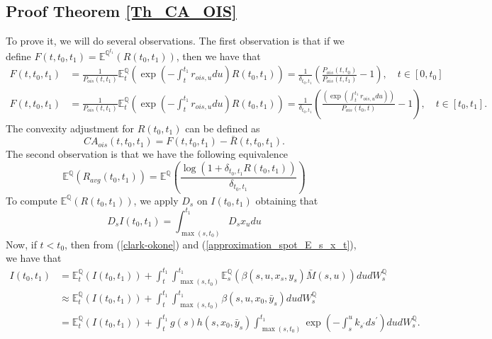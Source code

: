 \documentclass[a4paper,10pt]{article}
\newcommand{\1}{\mathbf{1}}
\begin{document}
\subsection{Proof Theorem \ref{Th_CA_OIS}}\label{Proof_CA_OIS_futures}
To prove it, we will do several observations. The first observation is that if we define $F(t,t_0,t_1) = \mathbb{E}^{\mathbb{Q}^{t_1}}\left( R(t_0,t_1)\right)$, then we have that
\begin{align*}
F(t,t_0,t_1)&= \frac{1}{P_{ois}(t,t_1)}  \mathbb{E}_{t}^{\mathbb{Q}}\left(\exp\left(-\int_{t}^{t_1} r_{ois,u} du \right) R(t_0,t_1) \right) = \frac{1}{\delta_{t_0,t_1}}\left(\frac{P_{ois}(t,t_0)}{P_{ois}(t,t_1)} - 1\right), \quad t \in [0,t_0] \\
F(t,t_0,t_1)&= \frac{1}{P_{ois}(t,t_1)} \mathbb{E}_{t}^{\mathbb{Q}}\left(\exp\left(-\int_{t}^{t_1} r_{ois,u} du \right) R(t_0,t_1) \right) = \frac{1}{\delta_{t_0,t_1}} \left(\frac{\left( \exp\left(\int_{t}^{t_1}r_{ois,u} du\right)\right)}{P_{ois}(t_0,t)}-1\right), \quad  t \in  [t_0, t_1].
\end{align*}
The convexity adjustment for $ R(t_0,t_1)$ can be defined as
\begin{equation}\label{R_ois_ca}
CA_{ois}(t,t_0,t_1) = F(t,t_0,t_1) - \bar{R}(t,t_0,t_1).
\end{equation}
The second observation is that we have the following equivalence
\begin{equation}\label{R_ois_avg}
\mathbb{E}^{\mathbb{Q}}\left(R_{avg}(t_0,t_1) \right) = \mathbb{E}^{\mathbb{Q}}\left( \frac{\log\left(1+ \delta_{t_0,t_1} R(t_0,t_1) \right)}{\delta_{t_0,t_1}} \right)  \end{equation}
To compute $\mathbb{E}^{\mathbb{Q}}\left(R(t_0,t_1)\right)$, we apply $D_s$ on $I(t_0,t_1)$ obtaining that
\begin{equation*}
D_s I(t_0,t_1) = \int_{\max(s, t_{0})}^{t_1}  D_s x_u du 
\end{equation*}
Now, if $t < t_0$, then from (\ref{clark-okone}) and (\ref{approximation_spot_E_s_x_t}), we have that 
\begin{align}\label{apprx_I_t0_t1}
I(t_0,t_1) &= \mathbb{E}_t^{\mathbb{Q}}\left(I(t_0,t_1)\right) + \int_{t}^{t_1}\int_{\max(s, t_{0})}^{t_1}  \mathbb{E}_s^{\mathbb{Q}}\left(\beta(s,u,x_s,y_s) \bar{M}(s,u) \right) du dW_s^{\mathbb{Q}} \nonumber \\
&\approx \mathbb{E}_t^{\mathbb{Q}}\left(I(t_0,t_1)\right) + \int_{t}^{t_1}\int_{\max(s, t_{0})}^{t_1} \beta(s,u,x_0,\bar{y}_s) du dW_s^{\mathbb{Q}}\nonumber \\
&= \mathbb{E}_t^{\mathbb{Q}}\left(I(t_0,t_1)\right) + \int_{t}^{t_1} g(s)h(s,x_0,\bar{y}_s)\int_{\max(s, t_{0})}^{t_1} \exp\left( -\int_{s}^{u} k_{s^{\prime}} ds^{\prime}\right) du dW_s^{\mathbb{Q}}.
\end{align}
\end{document}
